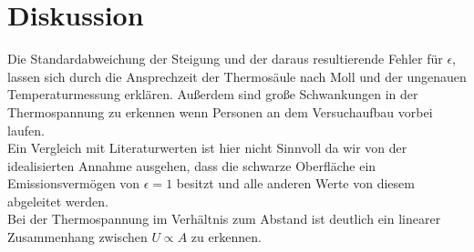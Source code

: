 \section{Diskussion}
\label{sec:Diskussion}
Die Standardabweichung der Steigung und der daraus resultierende Fehler für $\epsilon$, lassen sich durch die Ansprechzeit der Thermosäule nach Moll und der ungenauen Temperaturmessung erklären. Außerdem sind große Schwankungen in der Thermospannung zu erkennen wenn Personen an dem Versuchaufbau vorbei laufen.
\\
Ein Vergleich mit Literaturwerten ist hier nicht Sinnvoll da wir von der idealisierten Annahme ausgehen, dass die schwarze Oberfläche ein Emissionsvermögen von $\epsilon = 1$ besitzt und alle anderen Werte von diesem abgeleitet werden.
\\
Bei der Thermospannung im Verhältnis zum Abstand ist deutlich ein linearer Zusammenhang zwischen $U \propto A$ zu erkennen.
